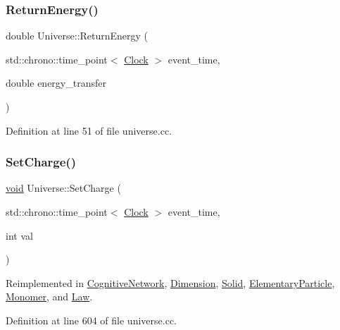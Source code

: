 \subsubsection{\texorpdfstring{Return\+Energy()}{ReturnEnergy()}}
{\footnotesize\ttfamily double Universe\+::\+Return\+Energy (\begin{DoxyParamCaption}\item[{std\+::chrono\+::time\+\_\+point$<$ \mbox{\hyperlink{universe_8h_a0ef8d951d1ca5ab3cfaf7ab4c7a6fd80}{Clock}} $>$}]{event\+\_\+time,  }\item[{double}]{energy\+\_\+transfer }\end{DoxyParamCaption})}



Definition at line 51 of file universe.\+cc.

\mbox{\label{class_universe_a3b3da7c86a7b75e5e5c0b7972ac82a87}} 
\subsubsection{\texorpdfstring{Set\+Charge()}{SetCharge()}}
{\footnotesize\ttfamily \mbox{\hyperlink{glad_8h_a950fc91edb4504f62f1c577bf4727c29}{void}} Universe\+::\+Set\+Charge (\begin{DoxyParamCaption}\item[{std\+::chrono\+::time\+\_\+point$<$ \mbox{\hyperlink{universe_8h_a0ef8d951d1ca5ab3cfaf7ab4c7a6fd80}{Clock}} $>$}]{event\+\_\+time,  }\item[{int}]{val }\end{DoxyParamCaption})\hspace{0.3cm}{\ttfamily [virtual]}}



Reimplemented in \mbox{\hyperlink{class_cognitive_network_a99f801aeca299186cc706696696749b1}{Cognitive\+Network}}, \mbox{\hyperlink{class_dimension_a6d3f7fa4a26b92d8ae6161a1b8bb8220}{Dimension}}, \mbox{\hyperlink{class_solid_a37503e6b25f912254414e778af2e75cd}{Solid}}, \mbox{\hyperlink{class_elementary_particle_abbc6d3c58509c4121df55bfef716d2f1}{Elementary\+Particle}}, \mbox{\hyperlink{class_monomer_a1ee35c888318e590082e6cd1772bb430}{Monomer}}, and \mbox{\hyperlink{class_law_a2e780573f6285f88d167d45a2e243d01}{Law}}.



Definition at line 604 of file universe.\+cc.

